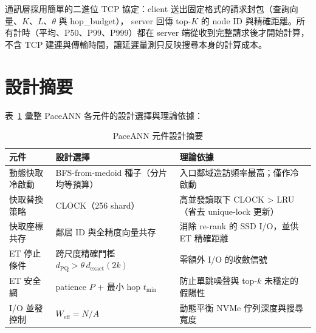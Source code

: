 通訊層採用簡單的二進位 TCP 協定：client 送出固定格式的請求封包（查詢向量、$K$、$L$、$\theta$ 與 hop\_budget），
server 回傳 top-$K$ 的 node ID 與精確距離。所有計時（平均、P50、P99、P999）都在 server 端從收到完整請求後才開始計算，
不含 TCP 建連與傳輸時間，讓延遲量測只反映搜尋本身的計算成本。

\section{設計摘要}
\label{sec:design-summary}

表~\ref{tab:design-summary} 彙整 PaceANN 各元件的設計選擇與理論依據：

\begin{table}[h]
\centering
\caption{PaceANN 元件設計摘要}
\label{tab:design-summary}
\begin{tabular}{p{3.2cm} p{3.8cm} p{5.5cm}}
\toprule
元件 & 設計選擇 & 理論依據 \\
\midrule
動態快取冷啟動 & BFS-from-medoid 種子（分片均等預算） & 入口鄰域造訪頻率最高；僅作冷啟動 \\
快取替換策略 & CLOCK（256 shard） & 高並發讀取下 CLOCK > LRU（省去 unique-lock 更新）\\
快取座標共存 & 鄰居 ID 與全精度向量共存 & 消除 re-rank 的 SSD I/O，並供 ET 精確距離 \\
ET 停止條件 & 跨尺度精確門檻 $d_\text{PQ} > \theta\, d_\text{exact}(2k)$ & 零額外 I/O 的收斂信號 \\
ET 安全網 & patience $P$ + 最小 hop $t_\text{min}$ & 防止單跳噪聲與 top-$k$ 未穩定的假陽性 \\
I/O 並發控制 & $W_\text{eff} = N / A$ & 動態平衡 NVMe 佇列深度與搜尋寬度 \\
\bottomrule
\end{tabular}
\end{table}
